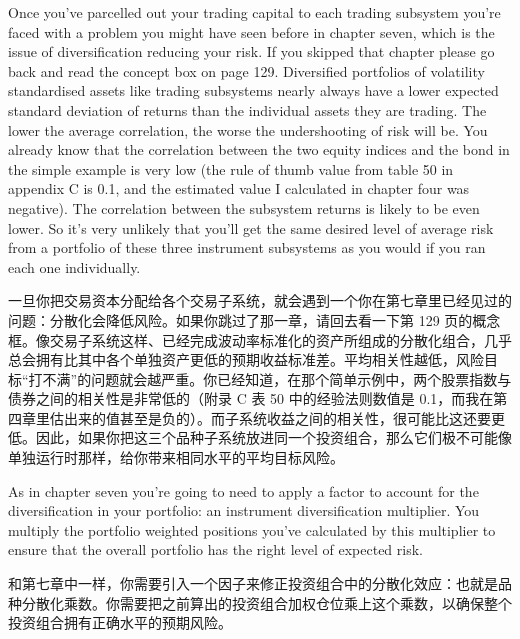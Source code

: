 \begin{englishblock} Once you've parcelled out your trading capital to each trading subsystem you're faced with a problem you might have seen before in chapter seven, which is the issue of diversification reducing your risk. If you skipped that chapter please go back and read the concept box on page 129. Diversified portfolios of volatility standardised assets like trading subsystems nearly always have a lower expected standard deviation of returns than the individual assets they are trading. The lower the average correlation, the worse the undershooting of risk will be. You already know that the correlation between the two equity indices and the bond in the simple example is very low (the rule of thumb value from table 50 in appendix C is 0.1, and the estimated value I calculated in chapter four was negative). The correlation between the subsystem returns is likely to be even lower. So it's very unlikely that you'll get the same desired level of average risk from a portfolio of these three instrument subsystems as you would if you ran each one individually. \end{englishblock}

\begin{chineseblock}一旦你把交易资本分配给各个交易子系统，就会遇到一个你在第七章里已经见过的问题：分散化会降低风险。如果你跳过了那一章，请回去看一下第 129 页的概念框。像交易子系统这样、已经完成波动率标准化的资产所组成的分散化组合，几乎总会拥有比其中各个单独资产更低的预期收益标准差。平均相关性越低，风险目标“打不满”的问题就会越严重。你已经知道，在那个简单示例中，两个股票指数与债券之间的相关性是非常低的（附录 C 表 50 中的经验法则数值是 0.1，而我在第四章里估出来的值甚至是负的）。而子系统收益之间的相关性，很可能比这还要更低。因此，如果你把这三个品种子系统放进同一个投资组合，那么它们极不可能像单独运行时那样，给你带来相同水平的平均目标风险。\end{chineseblock}

\bipairgap

\begin{englishblock} As in chapter seven you're going to need to apply a factor to account for the diversification in your portfolio: an instrument diversification multiplier. You multiply the portfolio weighted positions you've calculated by this multiplier to ensure that the overall portfolio has the right level of expected risk. \end{englishblock}

\begin{chineseblock}和第七章中一样，你需要引入一个因子来修正投资组合中的分散化效应：也就是品种分散化乘数。你需要把之前算出的投资组合加权仓位乘上这个乘数，以确保整个投资组合拥有正确水平的预期风险。\end{chineseblock}

